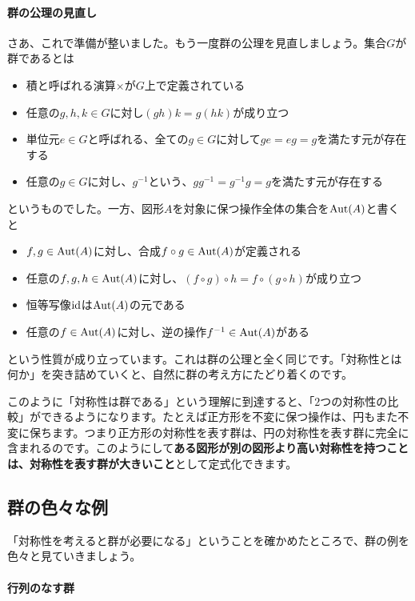 \paragraph{群の公理の見直し}

さあ、これで準備が整いました。もう一度群の公理を見直しましょう。集合$G$が群であるとは
\begin{itemize}
\item 積と呼ばれる演算$\times$が$G$上で定義されている
\item 任意の$g, h, k \in G$に対し$(gh)k = g(hk)$が成り立つ
\item 単位元$e \in G$と呼ばれる、全ての$g \in G$に対して$ge = eg = g$を満たす元が存在する
\item 任意の$g \in G$に対し、$g^{-1}$という、$gg^{-1} = g^{-1}g = g$を満たす元が存在する
\end{itemize}
というものでした。一方、図形$A$を対象に保つ操作全体の集合を$\operatorname{Aut}(A)$と書くと
\begin{itemize}
\item $f, g \in \operatorname{Aut}(A)$に対し、合成$f \circ g \in \operatorname{Aut}(A)$が定義される
\item 任意の$f, g, h \in \operatorname{Aut}(A)$に対し、$(f \circ g) \circ h = f \circ (g \circ h)$が成り立つ
\item 恒等写像$\operatorname{id}$は$\operatorname{Aut}(A)$の元である
\item 任意の$f \in \operatorname{Aut}(A)$に対し、逆の操作$f^{-1} \in \operatorname{Aut}(A)$がある
\end{itemize}
という性質が成り立っています。これは群の公理と全く同じです。「対称性とは何か」を突き詰めていくと、自然に群の考え方にたどり着くのです。

このように「対称性は群である」という理解に到達すると、「$2$つの対称性の比較」ができるようになります。たとえば正方形を不変に保つ操作は、円もまた不変に保ちます。つまり正方形の対称性を表す群は、円の対称性を表す群に完全に含まれるのです。このようにして\textbf{ある図形が別の図形より高い対称性を持つことは、対称性を表す群が大きいこと}として定式化できます。

\subsection{群の色々な例}

「対称性を考えると群が必要になる」ということを確かめたところで、群の例を色々と見ていきましょう。

\paragraph{行列のなす群}

